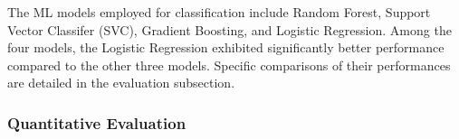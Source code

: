 \documentclass[final,british,a4paper,12pt]{phdthesis}
\begin{document}

The ML models employed for classification include Random Forest, Support Vector Classifer (SVC), Gradient Boosting, and Logistic Regression. Among the four models, the Logistic Regression exhibited significantly better performance compared to the other three models. Specific comparisons of their performances are detailed in the evaluation subsection. 



\subsubsection{Quantitative Evaluation}

\end{document}
